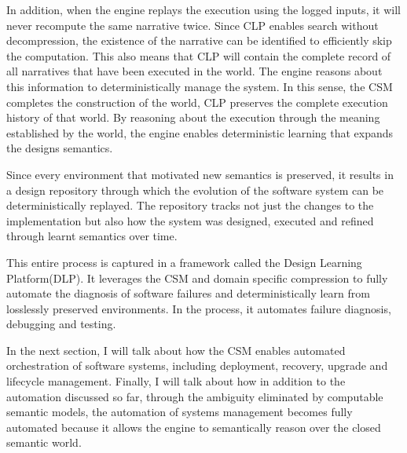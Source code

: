 In addition, when the engine replays the execution using the logged inputs, it will never recompute the same narrative twice. Since CLP enables search without decompression, the existence of the narrative can be identified to efficiently skip the computation. This also means that CLP will contain the complete record of all narratives that have been executed in the world. The engine reasons about this information to deterministically manage the system. In this sense, the CSM completes the construction of the world, CLP preserves the complete execution history of that world. By reasoning about the execution through the meaning established by the world, the engine enables deterministic learning that expands the designs semantics.

Since every environment that motivated new semantics is preserved, it results in a design repository through which the evolution of the software system can be deterministically replayed. The repository tracks not just the changes to the implementation but also how the system was designed, executed and refined through learnt semantics over time.

This entire process is captured in a framework called the Design Learning Platform(DLP). It leverages the CSM and domain specific compression to fully automate the diagnosis of software failures and deterministically learn from losslessly preserved environments. In the process, it automates failure diagnosis, debugging and testing.

In the next section, I will talk about how the CSM enables automated orchestration of software systems, including deployment, recovery, upgrade and lifecycle management. Finally, I will talk about how in addition to the automation discussed so far, through the ambiguity eliminated by computable semantic models, the automation of systems management becomes fully automated because it allows the engine to semantically reason over the closed semantic world.
